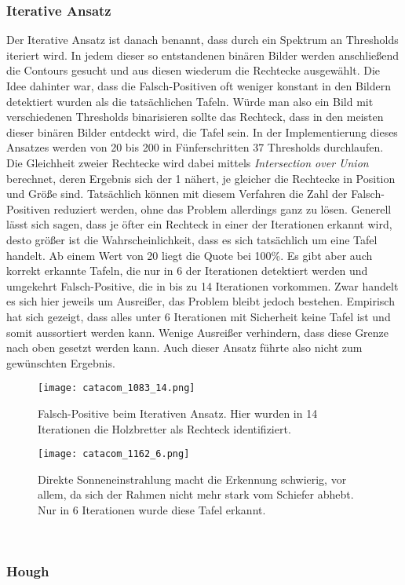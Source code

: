 \subsubsection*{ Iterative Ansatz}
Der Iterative Ansatz ist danach benannt, dass durch ein Spektrum an Thresholds iteriert wird. In jedem dieser so entstandenen binären Bilder werden anschließend die Contours gesucht und aus diesen wiederum die Rechtecke ausgewählt. Die Idee dahinter war, dass die Falsch-Positiven oft weniger konstant in den Bildern detektiert wurden als die tatsächlichen Tafeln. Würde man also ein Bild mit verschiedenen Thresholds binarisieren sollte das Rechteck, dass in den meisten dieser binären Bilder entdeckt wird, die Tafel sein. In der Implementierung dieses Ansatzes werden von 20 bis 200 in Fünferschritten 37 Thresholds durchlaufen. Die Gleichheit zweier Rechtecke wird dabei mittels \textit{Intersection over Union} berechnet, deren Ergebnis sich der 1 nähert, je gleicher die Rechtecke in Position und Größe sind.
Tatsächlich können mit diesem Verfahren die Zahl der Falsch-Positiven reduziert werden, ohne das Problem allerdings ganz zu lösen. Generell lässt sich sagen, dass je öfter ein Rechteck in einer der Iterationen erkannt wird, desto größer ist die Wahrscheinlichkeit, dass es sich tatsächlich um eine Tafel handelt. Ab einem Wert von 20 liegt die Quote bei 100\%. Es gibt aber auch korrekt erkannte Tafeln, die nur in 6 der Iterationen detektiert werden und umgekehrt Falsch-Positive, die in bis zu 14 Iterationen vorkommen. Zwar handelt es sich hier jeweils um Ausreißer, das Problem bleibt jedoch bestehen. Empirisch hat sich gezeigt, dass alles unter 6 Iterationen mit Sicherheit keine Tafel ist und somit aussortiert werden kann. Wenige Ausreißer verhindern, dass diese Grenze nach oben gesetzt werden kann. Auch dieser Ansatz führte also nicht zum gewünschten Ergebnis.
\begin{SCfigure}[0.5][h!]
\caption{Falsch-Positive beim Iterativen Ansatz. Hier wurden in 14 Iterationen die Holzbretter als Rechteck identifiziert.}
\texttt{[image: catacom\_1083\_14.png]}
\end{SCfigure} \begin{SCfigure}[0.5][h!]
\caption{Direkte Sonneneinstrahlung macht die Erkennung schwierig, vor allem, da sich der Rahmen nicht mehr stark vom Schiefer abhebt. Nur in 6 Iterationen wurde diese Tafel erkannt.}
\texttt{[image: catacom\_1162\_6.png]}
\end{SCfigure}\\
\subsubsection{Hough}

